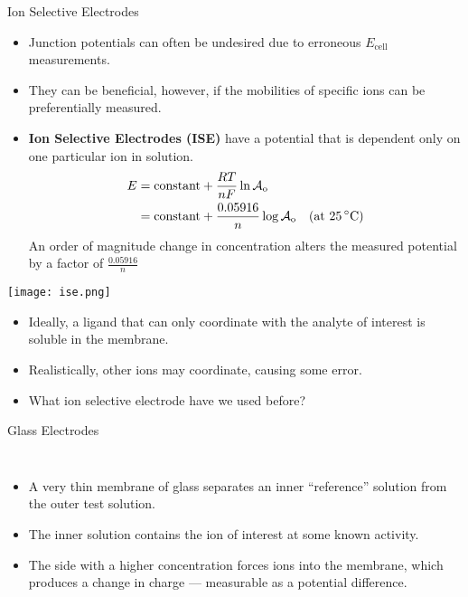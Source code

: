 \documentclass[notes=show]{beamer}
\begin{document}
\begin{frame}[allowframebreaks]{Ion Selective Electrodes}
	\begin{itemize}
		\item Junction potentials can often be undesired due to
			erroneous $E_\text{cell}$ measurements.
		\item They can be beneficial, however, if the mobilities of
			\alert{specific} ions can be \alert{preferentially}
			measured.
		\item \textbf{Ion Selective Electrodes (ISE)} have a potential
			that is dependent \alert{only} on one particular ion in
			solution.
			\begin{align*}
				E &= \text{constant} + \frac{RT}{nF} \ln
				\mathcal{A}_\text{o} \\
				&= \text{constant} + \frac{0.05916}{n} \log
				\mathcal{A}_\text{o} \quad \text{(at
				\SI{25}{\celsius})}
			\end{align*}
			An order of magnitude change in concentration alters the
			measured potential by a factor of $\frac{0.05916}{n}$
	\end{itemize}

	\framebreak
	
	\begin{center}
		\texttt{[image: ise.png]}
	\end{center}

	\begin{itemize}
		\item Ideally, a ligand that can \alert{only} coordinate with
			the analyte of interest is soluble in the membrane.
		\item Realistically, other ions \alert{may} coordinate, causing
			some error.
		\item What ion selective electrode have we used before?

	\end{itemize}
\end{frame}

\begin{frame}[allowframebreaks]{Glass Electrodes}
	\begin{columns}
	\begin{itemize}
		\item A very thin membrane of glass separates an
			inner ``reference'' solution from the
			outer test solution.
		\item The inner solution contains the ion of interest at some
			\alert{known} activity.
		\item The side with a higher concentration
			forces ions into the membrane, which
			produces a change in charge ---
			measurable as a potential difference.
	\end{itemize}
	\end{columns}
\end{frame}
\end{document}
